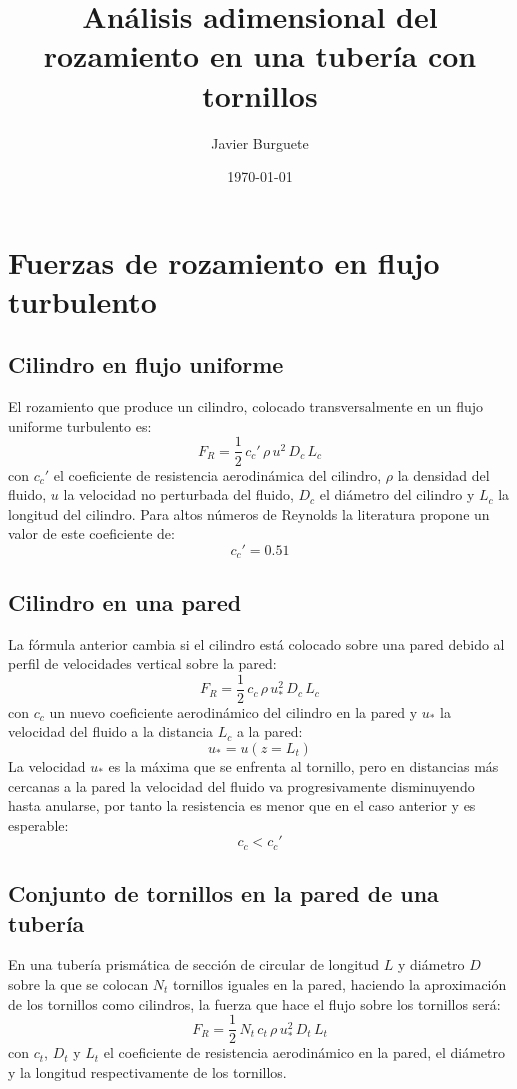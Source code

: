\documentclass[a4paper]{article}
\author{Javier Burguete}
\date{\today}
\title{Análisis adimensional del rozamiento en una tubería con tornillos}
\newcommand{\EQ}[2]{\begin{equation}#1\label{#2}\end{equation}}
\begin{document}
\section{Fuerzas de rozamiento en flujo turbulento}

\subsection{Cilindro en flujo uniforme}

El rozamiento que produce un cilindro, colocado transversalmente en un flujo
uniforme turbulento es:
\EQ{F_R=\frac12\,c_c'\,\rho\,u^2\,D_c\,L_c}{EqFrCilindroUniforme}
con $c_c'$ el coeficiente de resistencia aerodinámica del cilindro, $\rho$ la
densidad del fluido, $u$ la velocidad no perturbada del fluido, $D_c$ el
diámetro del cilindro y $L_c$ la longitud del cilindro. Para altos números de
Reynolds la literatura propone un valor de este coeficiente de:
\EQ{c_c'=0.51}{EqCc}

\subsection{Cilindro en una pared}

La fórmula anterior cambia si el cilindro está colocado sobre una pared debido
al perfil de velocidades vertical sobre la pared:
\EQ{F_R=\frac12\,c_c\,\rho\,u_*^2\,D_c\,L_c}{EqFrCilindroPared}
con $c_c$ un nuevo coeficiente aerodinámico del cilindro en la pared y $u_*$ la
velocidad del fluido a la distancia $L_c$ a la pared:
\EQ{u_*=u\left(z=L_t\right)}{EqUAsterisco}
La velocidad $u_*$ es la máxima que se enfrenta al tornillo, pero en distancias
más cercanas a la pared la velocidad del fluido va progresivamente disminuyendo
hasta anularse, por tanto la resistencia es menor que en el caso anterior y es
esperable:
\EQ{c_c<c_c'}{EqCcII}

\subsection{Conjunto de tornillos en la pared de una tubería}

En una tubería prismática de sección de circular de longitud $L$ y diámetro $D$
sobre la que se colocan $N_t$ tornillos iguales en la pared, haciendo la
aproximación de los tornillos como cilindros, la fuerza que hace el flujo
sobre los tornillos será:
\EQ{F_R=\frac12\,N_t\,c_t\,\rho\,u_*^2\,D_t\,L_t}{EqFrTornillos}
con $c_t$, $D_t$ y $L_t$ el coeficiente de resistencia aerodinámico en la pared,
el diámetro y la longitud respectivamente de los tornillos.
\end{document}
